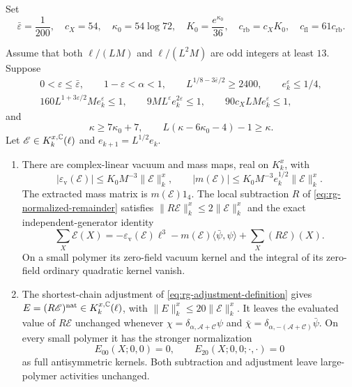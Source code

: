 Set
\[
 \bar\varepsilon=\frac1{200},\quad c_X=54,\quad
 \kappa_0=54\log72,\quad K_0=\frac{e^{\kappa_0}}{36},\quad
 c_{\mathrm{rb}}=c_XK_0,\quad c_{\mathrm{fl}}=61c_{\mathrm{rb}}.
\]

\begin{theorem}\label{thm:main}
Assume that both \(\ell/(LM)\) and \(\ell/(L^2M)\) are odd
integers at least \(13\). Suppose
\begin{equation}\label{eq:rg-contraction-parameters}
 \begin{gathered}
 0<\varepsilon\le\bar\varepsilon,\qquad 1-\varepsilon<\alpha<1,
 \qquad L^{1/8-3\bar\varepsilon/2}\ge2400,\qquad e_k^\varepsilon\le1/4,\\
 160L^{1+3\varepsilon/2}Me_k^\varepsilon\le1,\qquad
 9ML^\varepsilon e_k^{2\varepsilon}\le1,\qquad
 90c_XLMe_k^\varepsilon\le1,
 \end{gathered}
\end{equation}
and
\begin{equation}\label{eq:rg-contraction-polymer-parameters}
 \kappa\ge7\kappa_0+7,\qquad
 L(\kappa-6\kappa_0-4)-1\ge\kappa.
\end{equation}
Let \(\mathscr E\in K_k^{x,\mathbb C}(\ell)\) and
\(e_{k+1}=L^{1/2}e_k\).

\begin{enumerate}[label=\textup{(\roman*)},leftmargin=*]
\item There are complex-linear vacuum and mass maps, real on
\(K_k^x\), with
\[
 |\varepsilon_{\mathrm v}(\mathscr E)|
       \le K_0M^{-3}\|\mathscr E\|_k^x,\qquad
 |m(\mathscr E)|
       \le K_0M^{-3}e_k^{1/2}\|\mathscr E\|_k^x .
\]
The extracted mass matrix is \(m(\mathscr E)1_4\).
The local subtraction \(R\) of \eqref{eq:rg-normalized-remainder}
satisfies \(\|R\mathscr E\|_k^x\le2\|\mathscr E\|_k^x\) and the
exact independent-generator identity
\[
 \sum_X\mathscr E(X)
 =-\varepsilon_{\mathrm v}(\mathscr E)\ell^3
       -m(\mathscr E)\langle\bar\psi,\psi\rangle
       +\sum_X(R\mathscr E)(X).
\]
On a small polymer its zero-field vacuum kernel and the integral
of its zero-field ordinary quadratic kernel vanish.

\item The shortest-chain adjustment of
\eqref{eq:rg-adjustment-definition} gives
\(E=(R\mathscr E)^{\mathrm{nat}}\in K_k^{x,\mathbb C}(\ell)\), with
\(\|E\|_k^x\le20\|\mathscr E\|_k^x\). It leaves the evaluated
value of \(R\mathscr E\) unchanged whenever
\(\chi=\delta_{\alpha,\mathscr A+\mathscr C}\psi\) and
\(\bar\chi=\delta_{\alpha,-(\mathscr A+\mathscr C)}\bar\psi\).
On every small polymer it has the stronger normalization
\[
 E_{00}(X;0,0)=0,\qquad E_{20}(X;0,0;\cdot,\cdot)=0
\]
as full antisymmetric kernels. Both subtraction and adjustment
leave large-polymer activities unchanged.


\end{enumerate}
\end{theorem}
